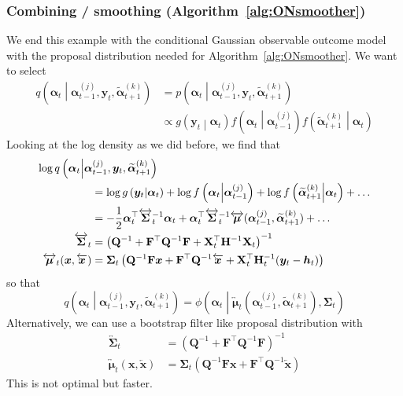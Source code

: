 \documentclass[notitlepage]{article}
\renewcommand{\vec}[1]{\bm{#1}}
\newcommand{\vecLarrow}[1]{\overleftarrow{\vec{#1}}}
\newcommand{\vecLRarrow}[1]{\overleftrightarrow{\vec{#1}}}
\newcommand{\mat}[1]{\mathbf{#1}}
\newcommand{\matLRarrow}[1]{\overleftrightarrow{\mat{#1}}}
\newcommand{\Lparen}[1]{\left( #1\right)}
\newcommand{\Cond}[2]{ #1 \middle\vert  #2}
\newcommand{\optor}[2]{#1\Lparen{#2}}
\newcommand{\optorC}[3]{\optor{#1}{\Cond{#2}{#3}}}
\newcommand{\pdensC}[2]{\optorC{p}{#1}{#2}}
\newcommand{\normaldC}[3]{\optorC{\phi}{#1}{#2,#3}}
\newcommand{\IDC}[2]{\optorC{q}{#1}{#2}}
\newcommand{\partic}[3]{#1_{#2}^{\Lparen{#3}}}
\newcommand{\particB}[3]{\widetilde{#1}_{#2}^{\Lparen{#3}}}
\begin{document}
\subsubsection*{Combining / smoothing (Algorithm~\ref{alg:ONsmoother})}
We end this example with the conditional Gaussian observable outcome model with the 
proposal distribution needed for Algorithm~\ref{alg:ONsmoother}. We want to select 
%
\begin{align*}
\IDC{\vec\alpha_t}{\partic{\vec{\alpha}}{t-1}{j},\vec{y}_t, \particB{\vec{\alpha}}{t+1}{k}} &=
		\pdensC{\vec{\alpha}_t}{\partic{\vec{\alpha}}{t-1}{j},\vec{y}_t, \particB{\vec{\alpha}}{t+1}{k}} \\
&\propto \optorC{g}{\vec{y}_t}{\vec\alpha_t}
		\optorC{f}{\vec{\alpha}_t}{\partic{\vec{\alpha}}{t-1}{j}}
		\optorC{f}{\particB{\vec{\alpha}}{t+1}{k}}{\vec{\alpha}_t}
\end{align*}
%
Looking at the log density as we did before, we find that %
%
\begin{align}
\log\IDC{\vec\alpha_t}{\partic{\vec{\alpha}}{t-1} j,\vec y_t,
 \particB{\vec{\alpha}}{t+1}k} 
	\hspace{-60pt}& \nonumber\\
&=\log\optorC{g}{\vec{y}_t}{\vec\alpha_t}
	+ \log\optorC{f}{\vec{\alpha}_t}{\partic{\vec{\alpha}}{t-1}{j}}
	+ \log\optorC{f}{\particB{\vec{\alpha}}{t+1}{k}}{\vec{\alpha}_t} 		
	+ \dots \nonumber\\
& = - \frac 12 \vec\alpha_t^\top \matLRarrow\Sigma^{-1}_t\vec\alpha_t
		+ \vec\alpha_t^\top \matLRarrow\Sigma_t^{-1}\vecLRarrow\mu(
			\partic{\vec{\alpha}}{t-1} j,
			\particB{\vec\alpha}{t + 1}k) + \dots \nonumber\\
\matLRarrow\Sigma_t &= \Lparen{\mat Q^{-1} + \mat F^\top\mat Q^{-1}\mat F + 
		\mat X_t^\top \mat H^{-1} \mat X_t}^{-1} \label{eq:normalSmoothPropCov}\\
\vecLRarrow\mu_t(\vec x, \vecLarrow x) &= \mat\Sigma_t\Lparen{
	\mat Q^{-1}\mat F\vec x + \mat F^\top \mat Q^{-1}\vecLarrow x + 
	\mat X_t^\top\mat H_t^{-1}(\vec y_t - \vec h_t)} \label{eq:normalSmoothPropMean}
\end{align}%
% 
so that
%
$$
\IDC{\vec\alpha_t}{\partic{\vec{\alpha}}{t-1} j,\vec y_t,
 \particB{\vec{\alpha}}{t+1}k} = 
 	\normaldC{\vec\alpha_t}{
		\vecLRarrow\mu_t(\partic{\vec{\alpha}}{t-1} j, 
			\particB{\vec{\alpha}}{t + 1}k)}{\mat\Sigma_t}
$$
%
Alternatively, we can use a bootstrap filter like proposal distribution with%
% 
\begin{equation}\label{eq:bootSM}\begin{split}
\matLRarrow\Sigma_t &= \Lparen{\mat Q^{-1} + \mat F^\top\mat Q^{-1}\mat F}^{-1} \\
\vecLRarrow\mu_t(\vec x, \vecLarrow x) &= \mat\Sigma_t\Lparen{
	\mat Q^{-1}\mat F\vec x + \mat F^\top \mat Q^{-1}\vecLarrow x}
\end{split}\end{equation}%
% 
This is not optimal but faster.
\end{document}
